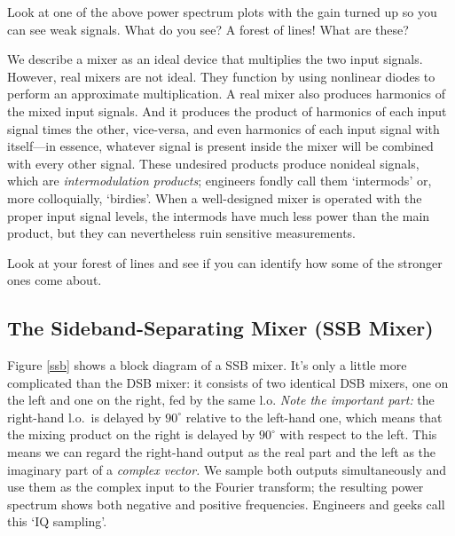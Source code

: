 \documentclass[12pt,preprint]{aastex}
\begin{document}
Look at one of the above power spectrum plots with the gain turned up so
you can see weak signals. What do you see? A forest of lines! What are
these?

We describe a mixer as an ideal device that multiplies the two input
signals. However, real mixers are not ideal. They function by using
nonlinear diodes to perform an approximate multiplication. A real mixer
also produces harmonics of the mixed input signals. And it produces
the product of harmonics of each input signal times the other,
vice-versa, and even harmonics of each input signal with itself---in
essence, whatever signal is present inside the mixer will be combined
with every other signal. These undesired products produce nonideal
signals, which are {\it intermodulation products}; engineers fondly call
them `intermods' or, more colloquially, `birdies'. When a well-designed
mixer is operated with the proper input signal levels, the intermods
have much less power than the main product, but they can nevertheless
ruin sensitive measurements.

Look at your forest of lines and see if you can identify how some of the
stronger ones come about.

\subsection{ The Sideband-Separating Mixer (SSB Mixer)}
\label{sectssb}

Figure \ref{ssb} shows a block diagram of a SSB mixer. It's only a
little more complicated than the DSB mixer: it consists of two identical
DSB mixers, one on the left and one on the right, fed by the same
l.o. {\it Note the important part:} the right-hand l.o.\ is delayed by
$90 ^\circ$ relative to the left-hand one, which means that the mixing
product on the right is delayed by $90^\circ$ with respect to the
left. This means we can regard the right-hand output as the real part
and the left as the imaginary part of a {\it complex vector.} We sample
both outputs simultaneously and use them as the complex input to the
Fourier transform; the resulting power spectrum shows both negative and
positive frequencies. Engineers and geeks call this `IQ sampling'.
\end{document}
